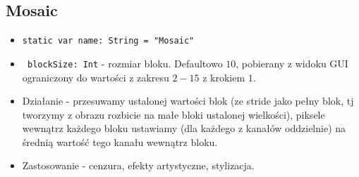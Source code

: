 \documentclass[a4paper]{article}
\begin{document}
\subsection{Mosaic}

\begin{itemize}
    \item \texttt{static var name: String = "Mosaic"}
    \item \texttt{ blockSize: Int} - rozmiar bloku. Defaultowo $10$, pobierany z widoku GUI ograniczony do wartości z zakresu $2-15$ z krokiem $1$.
    \item Działanie - przesuwamy ustalonej wartości blok (ze stride jako pełny blok, tj tworzymy z obrazu rozbicie na małe bloki ustalonej wielkości), piksele wewnątrz każdego bloku ustawiamy (dla każdego z kanałów oddzielnie) na średnią wartość tego kanału wewnątrz bloku.
    \item Zastosowanie - cenzura, efekty artystyczne, stylizacja.
\end{itemize}
\end{document}
